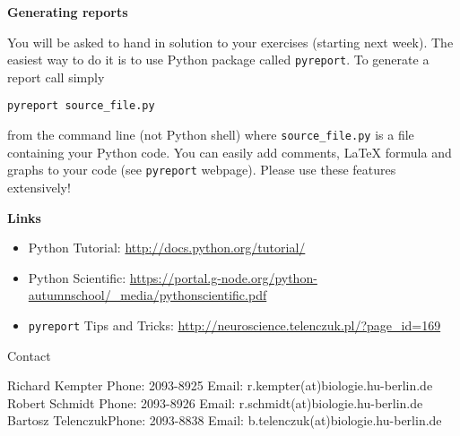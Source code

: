 \documentclass[12pt]{article}
\begin{document}
{\bf Generating reports}

You will be asked to hand in solution to your exercises (starting next
week). The easiest way to do it is to use Python package called
\texttt{pyreport}. To generate a report call simply 
\begin{verbatim}
pyreport source_file.py
\end{verbatim}

from the command line (not Python shell) where \texttt{source\_file.py} is a
file containing your Python code. You can easily add comments, LaTeX
formula and graphs to your code (see \texttt{pyreport} webpage).
Please use these features extensively!

\medskip
{\bf Links}
\begin{itemize}
    \item Python Tutorial: \url{http://docs.python.org/tutorial/}
    \item Python Scientific: 
        \url{https://portal.g-node.org/python-autumnschool/_media/pythonscientific.pdf}
    \item  \texttt{pyreport} Tips and Tricks:
        \url{http://neuroscience.telenczuk.pl/?page_id=169}
\end{itemize}


\vfill
\centerline{\CAP Contact}
\CAP

Richard Kempter \hfill Phone: 2093-8925 \hfill
Email: r.kempter(at)biologie.hu-berlin.de \\
Robert Schmidt \hfill Phone: 2093-8926 \hfill
Email: r.schmidt(at)biologie.hu-berlin.de \\
Bartosz Telenczuk\hfill Phone: 2093-8838 \hfill
Email: b.telenczuk(at)biologie.hu-berlin.de \\
\end{document}
